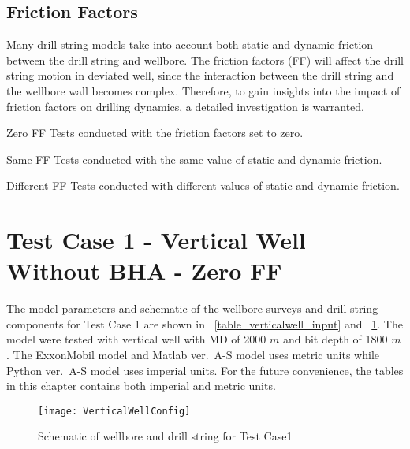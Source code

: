 \subsection{Friction Factors}
Many drill string models take into account both static and dynamic friction between the drill string and wellbore. The friction factors (FF) will affect the drill string motion in deviated well, since the interaction between the drill string and the wellbore wall becomes complex.\wording{}  Therefore, to gain insights into the impact of friction factors on drilling dynamics, a detailed investigation is warranted.\wording{}

\begin{definition}{Zero FF}
Tests conducted with the friction factors set to zero.
\end{definition}
\begin{definition}{Same FF}
Tests conducted with the same value of static and dynamic friction.
\end{definition}
\begin{definition}{Different FF}
Tests conducted with different values of static and dynamic friction.
\end{definition}




\section{Test Case 1 - Vertical Well Without BHA - Zero FF}
The model parameters and schematic of the wellbore surveys and drill string components for Test Case 1 are shown in \tablename~\ref{table_verticalwell_input} and \figurename~\ref{figure_verticalwell}. The model were tested with vertical well with MD of 2000 $m$ and bit depth of 1800 $m$. The ExxonMobil model and Matlab ver.\ A-S model uses metric units while Python ver.\ A-S model uses imperial units. For the future convenience, the tables in this chapter contains both imperial and metric units.

\begin{figure}
  \centering
  \texttt{[image: VerticalWellConfig]}
  \caption[Schematic of wellbore and drill string for Test Case1]{Schematic of wellbore and drill string for Test Case1}\label{figure_verticalwell}
\end{figure}


